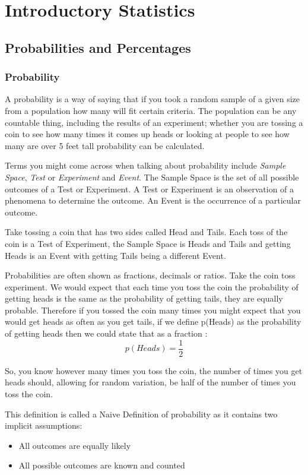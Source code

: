 \chapter{Introductory Statistics} \label{Introductory Statistics}
\section{Probabilities and Percentages}
\subsection{Probability}
A probability is a way of saying that if you took a random sample of a given size from a population how many will fit certain criteria.  The population can be any countable thing, including the results of an experiment; whether you are tossing a coin to see how many times it comes up heads or looking at people to see how many are over 5 feet tall probability can be calculated.

Terms you might come across when talking about probability include \emph{Sample Space}, \emph{Test} or \emph{Experiment} and \emph{Event}.  The Sample Space is the set of all possible outcomes of a Test or Experiment.  A Test or Experiment is an observation of a phenomena to determine the outcome.  An Event is the occurrence of a particular outcome.

Take tossing a coin that has two sides called Head and Tails.  Each toss of the coin is a Test of Experiment, the Sample Space is Heads and Tails and getting Heads is an Event with getting Tails being a different Event.

Probabilities are often shown as fractions, decimals or ratios. Take the coin toss experiment.  We would expect that each time you toss the coin the probability of getting heads is the same as the probability of getting tails, they are equally probable.  Therefore if you tossed the coin many times you might expect that you would get heads as often as you get tails, if we define p(Heads) as the probability of getting heads then we could state that as a fraction
:
\begin{equation}
    p(Heads) = \frac{1}{2}
\end{equation}

So, you know however many times you toss the coin, the number of times you get heads should, allowing for random variation, be half of the number of times you toss the coin.

This definition is called a Naive Definition of probability as it contains two implicit assumptions:
\begin{itemize}
    \item All outcomes are equally likely
    \item All possible outcomes are known and counted
\end{itemize}


